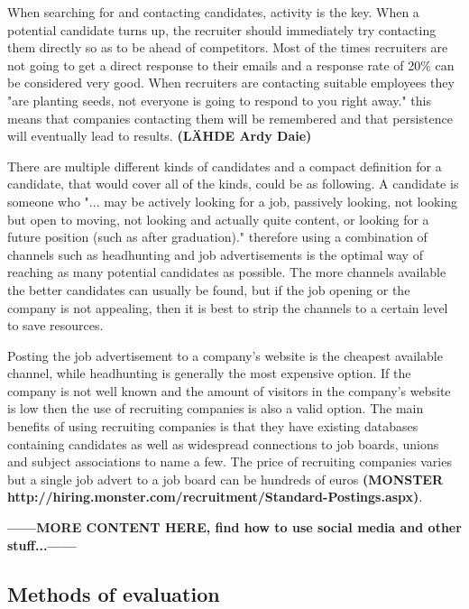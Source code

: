 \documentclass[11pt,a4paper,oneside,article]{memoir}
\begin{document}
When searching for and contacting candidates, activity is the key. When a potential candidate turns up, the recruiter should immediately try contacting them directly so as to be ahead of competitors. Most of the times recruiters are not going to get a direct response to their emails and a response rate of 20\% can be considered very good. When recruiters are contacting suitable employees they "are planting seeds, not everyone is going to respond to you right away." this means that companies contacting them will be remembered and that persistence will eventually lead to results. \textbf{(LÄHDE Ardy Daie)}

There are multiple different kinds of candidates and a compact definition for a candidate, that would cover all of the kinds, could be as following. A candidate is someone who "... may be actively looking for a job, passively looking, not looking but open to moving, not looking and actually quite content, or looking for a future position (such as after graduation)." \cite[p.~24]{mcculler:book} therefore using a combination of channels such as headhunting and job advertisements is the optimal way of reaching as many potential candidates as possible. The more channels available the better candidates can usually be found, but if the job opening or the company is not appealing, then it is best to strip the channels to a certain level to save resources.

Posting the job advertisement to a company's website is the cheapest available channel, while headhunting is generally the most expensive option. If the company is not well known and the amount of visitors in the company's website is low then the use of recruiting companies is also a valid option. The main benefits of using recruiting companies is that they have existing databases containing candidates as well as widespread connections to job boards, unions and subject associations to name a few. The price of recruiting companies varies but a single job advert to a job board can be hundreds of euros \textbf{(MONSTER http://hiring.monster.com/recruitment/Standard-Postings.aspx)}.

\textbf{------MORE CONTENT HERE, find how to use social media and other stuff...------}


\subsection{Methods of evaluation}
\end{document}
